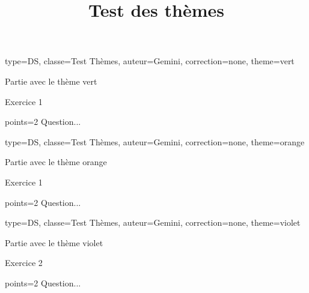 \documentclass{nfdevoirs}
\title{Test des thèmes}
\begin{document}
\begin{devoir}{
  type=DS,
  classe={Test Thèmes},
  auteur={Gemini},
  correction=none,
  theme=vert
}
\begin{partie}{Partie avec le thème vert}
    \begin{exercice}{Exercice 1}
        \begin{question}{points=2}
            Question...
        \end{question}
    \end{exercice}
\end{partie}
\end{devoir}

\newpage

\begin{devoir}{
  type=DS,
  classe={Test Thèmes},
  auteur={Gemini},
  correction=none,
  theme=orange
}
\begin{partie}{Partie avec le thème orange}
    \begin{exercice}{Exercice 1}
        \begin{question}{points=2}
            Question...
        \end{question}
    \end{exercice}
\end{partie}
\end{devoir}

\newpage

\begin{devoir}{
  type=DS,
  classe={Test Thèmes},
  auteur={Gemini},
  correction=none,
  theme=violet
}
\begin{partie}{Partie avec le thème violet}
    \begin{exercice}{Exercice 2}
        \begin{question}{points=2}
            Question...
        \end{question}
    \end{exercice}
\end{partie}
\end{devoir}
\end{document}
